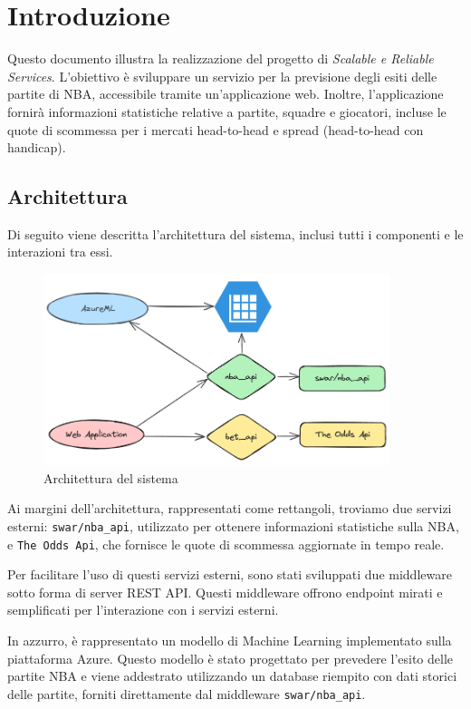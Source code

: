 \chapter{Introduzione}

Questo documento illustra la realizzazione del progetto di \textit{Scalable e Reliable Services}. L'obiettivo è sviluppare un servizio per la previsione degli esiti delle partite di NBA, accessibile tramite un'applicazione web. Inoltre, l'applicazione fornirà informazioni statistiche relative a partite, squadre e giocatori, incluse le quote di scommessa per i mercati head-to-head e spread (head-to-head con handicap).

\section{Architettura}

Di seguito viene descritta l'architettura del sistema, inclusi tutti i componenti e le interazioni tra essi.

\begin{figure}[H]
\centering
\includegraphics[width=0.9\textwidth]{img/architecture.png}
\caption{Architettura del sistema}
\end{figure}

Ai margini dell'architettura, rappresentati come rettangoli, troviamo due servizi esterni: \texttt{swar/nba\_api}, utilizzato per ottenere informazioni statistiche sulla NBA, e \texttt{The Odds Api}, che fornisce le quote di scommessa aggiornate in tempo reale.

Per facilitare l'uso di questi servizi esterni, sono stati sviluppati due middleware sotto forma di server REST API. Questi middleware offrono endpoint mirati e semplificati per l'interazione con i servizi esterni.

In azzurro, è rappresentato un modello di Machine Learning implementato sulla piattaforma Azure. Questo modello è stato progettato per prevedere l'esito delle partite NBA e viene addestrato utilizzando un database riempito con dati storici delle partite, forniti direttamente dal middleware \texttt{swar/nba\_api}.

